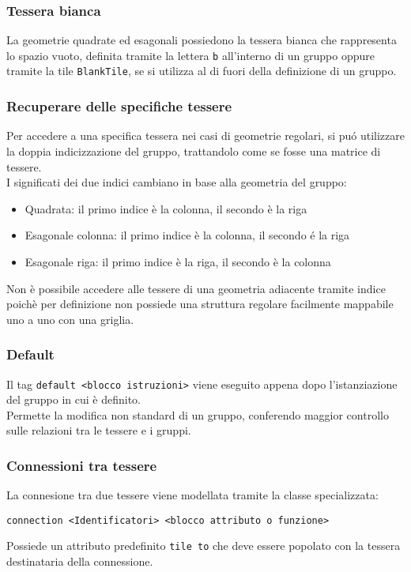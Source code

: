 \subsubsection{Tessera bianca}
La geometrie quadrate ed esagonali possiedono la tessera bianca che rappresenta lo spazio vuoto, 
definita tramite la lettera \lstinline|b| all'interno di un gruppo oppure tramite la tile \lstinline{BlankTile},
se si utilizza al di fuori della definizione di un gruppo.  

\subsubsection{Recuperare delle specifiche tessere}
Per accedere a una specifica tessera nei casi di geometrie regolari, si puó utilizzare la doppia
indicizzazione del gruppo, trattandolo come se fosse una matrice di tessere. \\
I significati dei due indici cambiano in base alla geometria del gruppo:
\begin{itemize}
    \item Quadrata: il primo indice è la colonna, il secondo è la riga
    \item Esagonale colonna: il primo indice è la colonna, il secondo é la riga
    \item Esagonale riga: il primo indice è la riga, il secondo è la colonna
\end{itemize}
Non è possibile accedere alle tessere di una geometria adiacente tramite indice poichè per definizione
non possiede una struttura regolare facilmente mappabile uno a uno con una griglia. 

\subsubsection{Default}
Il tag \lstinline|default <blocco istruzioni>| viene eseguito appena dopo l'istanziazione 
del gruppo in cui è definito. \\
Permette la modifica non standard di un gruppo, conferendo maggior controllo sulle relazioni tra le tessere 
e i gruppi.

\subsubsection{Connessioni tra tessere}
La connesione tra due tessere viene modellata tramite la classe specializzata:
\begin{lstlisting}
connection <Identificatori> <blocco attributo o funzione>
\end{lstlisting}
Possiede un attributo predefinito \lstinline|tile to| che deve essere popolato con la tessera 
destinataria della connessione.

